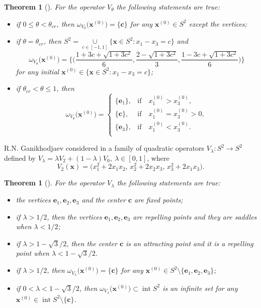 \documentclass[11pt,reqno]{amsart}
\newtheorem{theorem}[subsection]{Theorem}
\numberwithin{equation}{section} \setcounter{tocdepth}{1}
\DeclareMathOperator{\inte}{int}
\begin{document}
\begin{theorem}[\cite{Vlen}] For the operator $V_\theta$ the following statements are true:
\begin{itemize}
\item[i)] if $0\leq\theta < \theta_{cr}$, then $\omega_{V_\theta} \big(\mathbf{x}^{(0)}\big)=\{\mathbf{c}\}$ for any $\mathbf{x}^{(0)}\in S^2$ except the vertices;
\item[ii)] if $\theta = \theta_{cr}$, then $S^2=\mathop{\cup}\limits_{c\in[-1,1]}\{\mathbf{x}\in S^2: x_1-x_3=c\}$ and
\[\omega_{V_\theta} \big(\mathbf{x}^{(0)}\big)=\Big\{\Big(\frac{1+3c+\sqrt{1+3c^2}}{6},\frac{2-\sqrt{1+3c^2}}{3}, \frac{1-3c+\sqrt{1+3c^2}}{6}\Big)\Big\}\]
for any initial $\mathbf{x}^{(0)}\in\{\mathbf{x}\in S^2: x_1-x_3=c\}$;
\item[iii)] if $\theta_{cr}<\theta\leq 1$, then
\[\omega_{V_\theta} \big(\mathbf{x}^{(0)}\big)=\begin{cases}
\{\mathbf{e}_1\},& \text{if} \quad x_1^{(0)}> x_3^{(0)},\\
\{\mathbf{c}\},& \text{if} \quad x_1^{(0)}= x_3^{(0)}>0,\\
\{\mathbf{e}_3\},& \text{if} \quad x_1^{(0)}< x_3^{(0)}.\\
\end{cases}\]
\end{itemize}
\end{theorem}

R.N. Ganikhodjaev  considered  in \cite{Gdan} a family of quadratic operators $V_\lambda \colon S^2 \to S^2$ defined
by $V_\lambda = \lambda V_2 + (1 -\lambda)V_0, \  \lambda \in [0, 1]$, where
\[V_2(\mathbf{x}) = \big(x^2_1+ 2x_1x_2, \,  x^2_2+ 2x_2x_3, \,  x^2_3 + 2x_1x_3\big).\]

\begin{theorem}[\cite{Gdan}]   For the operator $V_\lambda$ the following statements are true:
\begin{itemize}
\item[i)] the vertices $\mathbf{e}_1, \mathbf{e}_2, \mathbf{e}_3$ and the center $\mathbf{c}$ are fixed points;
\item[ii)] if $\lambda > 1/2$, then the vertices  $\mathbf{e}_1, \mathbf{e}_2, \mathbf{e}_3$ are repelling points and they are saddles
when $\lambda < 1/2$;
\item[iii)] if $\lambda > 1 -\sqrt{3}/2$, then the center $\mathbf{c}$ is an attracting point and it is a repelling point
when $\lambda < 1 -\sqrt{3}/2$.
\item[iv)] if $\lambda > 1/2$, then  $\omega_{V_\lambda} \big(\mathbf{x}^{(0)}\big)=\{\mathbf{c}\}$ for any $\mathbf{x}^{(0)}\in S^2\setminus\{\mathbf{e}_1, \mathbf{e}_2, \mathbf{e}_3\}$;
\item[v)] if $0 < \lambda < 1 -\sqrt{3}/2$, then $\omega_{V_\lambda} \big(\mathbf{x}^{(0)}\big)\subset \inte  S^2 $ is an infinite set for any
$\mathbf{x}^{(0)}\in \inte S^2\setminus \{\mathbf{c}\}$.
\end{itemize}
\end{theorem}
\end{document}
